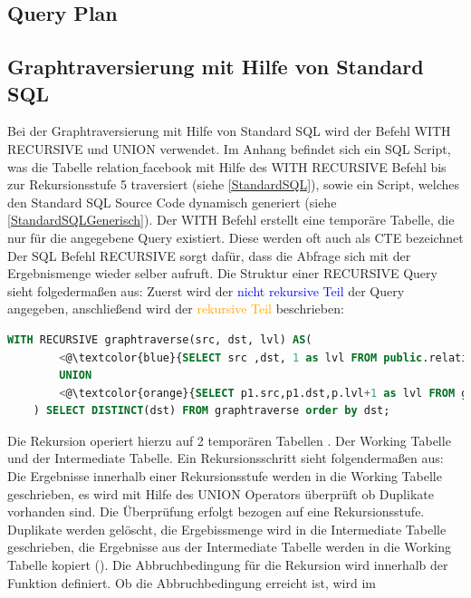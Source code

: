 \subsection{Query Plan}

\subsection{Graphtraversierung mit Hilfe von Standard \ac{SQL}}
Bei der Graphtraversierung mit Hilfe von Standard \ac{SQL} wird der Befehl WITH RECURSIVE und UNION verwendet. Im Anhang befindet sich ein SQL
Script, was die Tabelle relation$\_$facebook mit Hilfe des WITH RECURSIVE Befehl bis zur Rekursionsstufe 5 traversiert (siehe \ref{StandardSQL}),
sowie ein Script, welches den Standard SQL Source Code dynamisch generiert (siehe \ref{StandardSQLGenerisch}).
Der WITH Befehl erstellt eine temporäre Tabelle, die nur für die angegebene Query existiert. Diese werden oft auch als \ac{CTE} bezeichnet
Der SQL Befehl RECURSIVE sorgt dafür, dass die Abfrage sich mit der Ergebnismenge wieder selber aufruft. Die Struktur einer RECURSIVE Query sieht folgedermaßen aus:
Zuerst wird der \textcolor{blue}{nicht rekursive Teil} der Query angegeben, anschließend wird der \textcolor{orange}{rekursive Teil} beschrieben:
\begin{lstlisting}[language=SQL,caption = Rekursiver und nicht rekursiver Teil,frame=single, label={StrukturderQuery} ]
    WITH RECURSIVE graphtraverse(src, dst, lvl) AS(
        <@\textcolor{blue}{SELECT src ,dst, 1 as lvl FROM public.relation$\_$facebook WHERE src =765} @>
        UNION
        <@\textcolor{orange}{SELECT p1.src,p1.dst,p.lvl+1 as lvl FROM graphtraverse p, relation$\_$facebook p1 WHERE p1.src IN ( p.dst ) and lvl<5} @>
    ) SELECT DISTINCT(dst) FROM graphtraverse order by dst;
\end{lstlisting}
Die Rekursion operiert hierzu auf 2 temporären Tabellen
. Der Working Tabelle und der Intermediate Tabelle. Ein Rekursionsschritt sieht folgendermaßen aus: Die Ergebnisse innerhalb einer Rekursionsstufe werden in die
Working Tabelle geschrieben, es wird mit Hilfe des UNION Operators überprüft ob Duplikate vorhanden sind. Die Überprüfung erfolgt bezogen auf eine Rekursionsstufe.
Duplikate werden gelöscht, die Ergebissmenge wird in die Intermediate Tabelle geschrieben, die Ergebnisse aus der Intermediate Tabelle werden in die Working Tabelle
kopiert (\cite{postgreswithrecursive}). Die Abbruchbedingung für die Rekursion wird innerhalb der Funktion definiert. Ob die Abbruchbedingung erreicht ist, wird im

